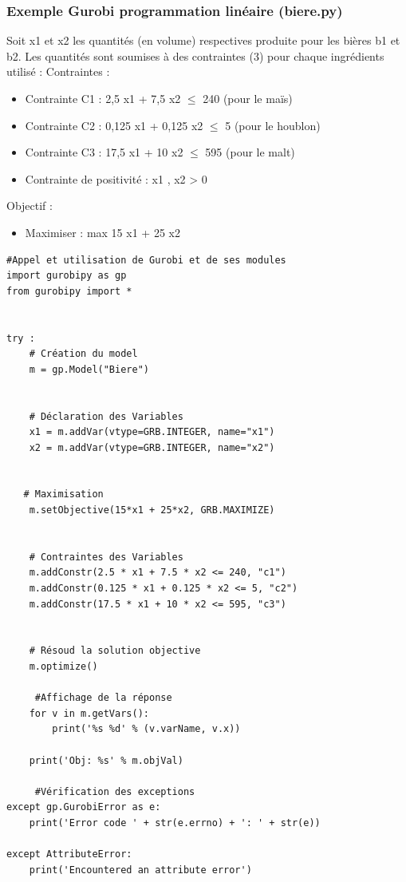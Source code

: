 \documentclass[a4paper, 12pt, twoside]{article}
\begin{document}
\subsubsection{Exemple Gurobi programmation linéaire (biere.py)}
Soit x1 et x2 les quantités (en volume) respectives produite pour les bières b1 et b2. Les quantités sont soumises à des contraintes (3) pour chaque ingrédients utilisé : \newline \textsf{Contraintes : }
\begin{itemize} 
\item   Contrainte C1 : 2,5 x1 + 7,5 x2  $\leq$ 240 (pour le maïs)
\item   Contrainte C2 : 0,125 x1 + 0,125 x2 $\leq$ 5 (pour le houblon)
\item   Contrainte C3 : 17,5 x1 + 10 x2  $\leq$ 595 (pour le malt)
\item  Contrainte  de positivité : x1 , x2 > 0
\end{itemize}
\textsf{Objectif : }
\begin{itemize} 
\item Maximiser : max 15 x1 + 25 x2
\end{itemize}

\begin{verbatim}
#Appel et utilisation de Gurobi et de ses modules
import gurobipy as gp
from gurobipy import *


try : 
    # Création du model
    m = gp.Model("Biere")


    # Déclaration des Variables
    x1 = m.addVar(vtype=GRB.INTEGER, name="x1")
    x2 = m.addVar(vtype=GRB.INTEGER, name="x2")
   
   
   # Maximisation
    m.setObjective(15*x1 + 25*x2, GRB.MAXIMIZE)
    

    # Contraintes des Variables
    m.addConstr(2.5 * x1 + 7.5 * x2 <= 240, "c1")
    m.addConstr(0.125 * x1 + 0.125 * x2 <= 5, "c2")
    m.addConstr(17.5 * x1 + 10 * x2 <= 595, "c3")
    
   
    # Résoud la solution objective 
    m.optimize()

     #Affichage de la réponse
    for v in m.getVars():
        print('%s %d' % (v.varName, v.x))

    print('Obj: %s' % m.objVal)

     #Vérification des exceptions
except gp.GurobiError as e:
    print('Error code ' + str(e.errno) + ': ' + str(e))

except AttributeError:
    print('Encountered an attribute error')    
\end{verbatim}
\end{document}
